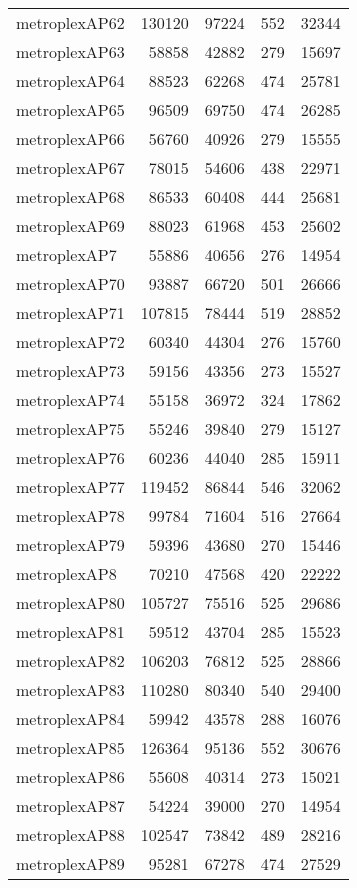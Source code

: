 \begin{tabular}{lrrrr}
metroplexAP62 & 130120 & 97224 & 552 & 32344 \\
metroplexAP63 & 58858 & 42882 & 279 & 15697 \\
metroplexAP64 & 88523 & 62268 & 474 & 25781 \\
metroplexAP65 & 96509 & 69750 & 474 & 26285 \\
metroplexAP66 & 56760 & 40926 & 279 & 15555 \\
metroplexAP67 & 78015 & 54606 & 438 & 22971 \\
metroplexAP68 & 86533 & 60408 & 444 & 25681 \\
metroplexAP69 & 88023 & 61968 & 453 & 25602 \\
metroplexAP7 & 55886 & 40656 & 276 & 14954 \\
metroplexAP70 & 93887 & 66720 & 501 & 26666 \\
metroplexAP71 & 107815 & 78444 & 519 & 28852 \\
metroplexAP72 & 60340 & 44304 & 276 & 15760 \\
metroplexAP73 & 59156 & 43356 & 273 & 15527 \\
metroplexAP74 & 55158 & 36972 & 324 & 17862 \\
metroplexAP75 & 55246 & 39840 & 279 & 15127 \\
metroplexAP76 & 60236 & 44040 & 285 & 15911 \\
metroplexAP77 & 119452 & 86844 & 546 & 32062 \\
metroplexAP78 & 99784 & 71604 & 516 & 27664 \\
metroplexAP79 & 59396 & 43680 & 270 & 15446 \\
metroplexAP8 & 70210 & 47568 & 420 & 22222 \\
metroplexAP80 & 105727 & 75516 & 525 & 29686 \\
metroplexAP81 & 59512 & 43704 & 285 & 15523 \\
metroplexAP82 & 106203 & 76812 & 525 & 28866 \\
metroplexAP83 & 110280 & 80340 & 540 & 29400 \\
metroplexAP84 & 59942 & 43578 & 288 & 16076 \\
metroplexAP85 & 126364 & 95136 & 552 & 30676 \\
metroplexAP86 & 55608 & 40314 & 273 & 15021 \\
metroplexAP87 & 54224 & 39000 & 270 & 14954 \\
metroplexAP88 & 102547 & 73842 & 489 & 28216 \\
metroplexAP89 & 95281 & 67278 & 474 & 27529 \\

\end{tabular}
